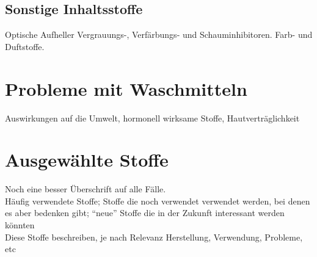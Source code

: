 \documentclass[12pt, ngerman]{article}
\begin{document}


\subsection{Sonstige Inhaltsstoffe}
Optische Aufheller
Vergrauungs-, Verfärbungs- und Schauminhibitoren. Farb- und Duftstoffe.


\section{Probleme mit Waschmitteln}
Auswirkungen auf die Umwelt, hormonell wirksame Stoffe, Hautverträglichkeit

\section{Ausgewählte Stoffe}
Noch eine besser Überschrift auf alle Fälle.\\

Häufig verwendete Stoffe; Stoffe die noch verwendet verwendet werden, bei denen es aber bedenken gibt; "`neue"' Stoffe die in der Zukunft interessant werden könnten\\

Diese Stoffe beschreiben, je nach Relevanz Herstellung, Verwendung, Probleme, etc






\clearpage
\nocite{*}
\printbibliography[title=\section{Literaturverzeichnis}]
\end{document}
